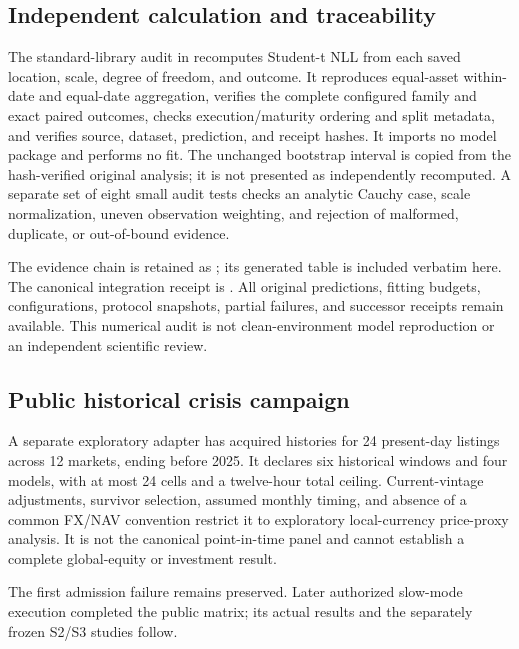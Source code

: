 \documentclass[11pt,a4paper]{article}
\begin{document}
\subsection{Independent calculation and traceability}
The standard-library audit in  recomputes Student-t NLL from each saved location, scale, degree of freedom, and outcome. It reproduces equal-asset within-date and equal-date aggregation, verifies the complete configured family and exact paired outcomes, checks execution/maturity ordering and split metadata, and verifies source, dataset, prediction, and receipt hashes. It imports no model package and performs no fit. The unchanged bootstrap interval is copied from the hash-verified original analysis; it is not presented as independently recomputed. A separate set of eight small audit tests checks an analytic Cauchy case, scale normalization, uneven observation weighting, and rejection of malformed, duplicate, or out-of-bound evidence.

The evidence chain is retained as ; its generated table is included verbatim here. The canonical integration receipt is . All original predictions, fitting budgets, configurations, protocol snapshots, partial failures, and successor receipts remain available. This numerical audit is not clean-environment model reproduction or an independent scientific review.

\subsection{Public historical crisis campaign}
A separate exploratory adapter has acquired histories for 24 present-day listings across 12 markets, ending before 2025. It declares six historical windows and four models, with at most 24 cells and a twelve-hour total ceiling. Current-vintage adjustments, survivor selection, assumed monthly timing, and absence of a common FX/NAV convention restrict it to exploratory local-currency price-proxy analysis. It is not the canonical point-in-time panel and cannot establish a complete global-equity or investment result.

The first admission failure remains preserved. Later authorized slow-mode execution completed the public matrix; its actual results and the separately frozen S2/S3 studies follow.



\end{document}
